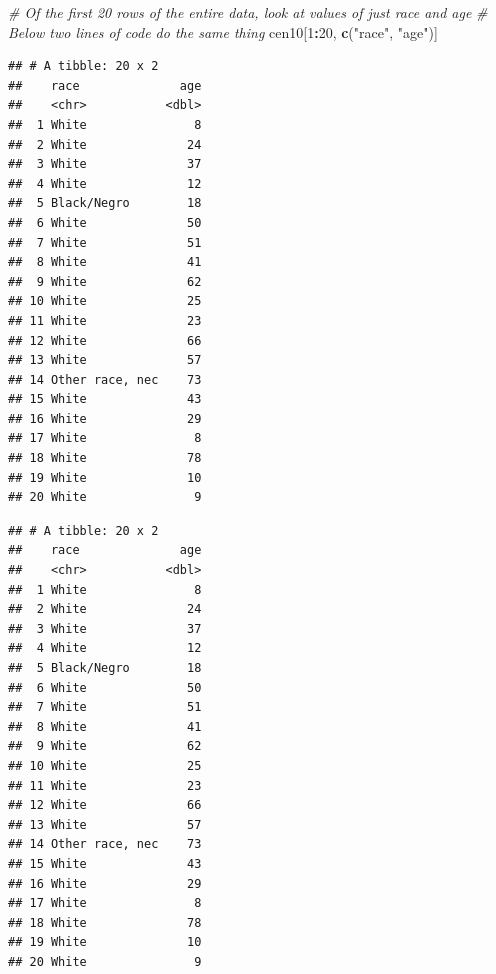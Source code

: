 \documentclass[]{book}
\newenvironment{Shaded}{\begin{snugshade}}{\end{snugshade}}
\newcommand{\KeywordTok}[1]{\textcolor[rgb]{0.13,0.29,0.53}{\textbf{#1}}}
\newcommand{\DecValTok}[1]{\textcolor[rgb]{0.00,0.00,0.81}{#1}}
\newcommand{\StringTok}[1]{\textcolor[rgb]{0.31,0.60,0.02}{#1}}
\newcommand{\CommentTok}[1]{\textcolor[rgb]{0.56,0.35,0.01}{\textit{#1}}}
\newcommand{\OperatorTok}[1]{\textcolor[rgb]{0.81,0.36,0.00}{\textbf{#1}}}
\newcommand{\NormalTok}[1]{#1}
\theoremstyle{definition}
\theoremstyle{definition}
\theoremstyle{definition}
\theoremstyle{remark}
\begin{document}
\begin{Shaded}
\begin{Highlighting}[]
\CommentTok{# Of the first 20 rows of the entire data, look at values of just race and age}
\CommentTok{# Below two lines of code do the same thing}
\NormalTok{cen10[}\DecValTok{1}\OperatorTok{:}\DecValTok{20}\NormalTok{, }\KeywordTok{c}\NormalTok{(}\StringTok{"race"}\NormalTok{, }\StringTok{"age"}\NormalTok{)]}
\end{Highlighting}
\end{Shaded}

\begin{verbatim}
## # A tibble: 20 x 2
##    race              age
##    <chr>           <dbl>
##  1 White               8
##  2 White              24
##  3 White              37
##  4 White              12
##  5 Black/Negro        18
##  6 White              50
##  7 White              51
##  8 White              41
##  9 White              62
## 10 White              25
## 11 White              23
## 12 White              66
## 13 White              57
## 14 Other race, nec    73
## 15 White              43
## 16 White              29
## 17 White               8
## 18 White              78
## 19 White              10
## 20 White               9
\end{verbatim}

\begin{Shaded}
\end{Shaded}

\begin{verbatim}
## # A tibble: 20 x 2
##    race              age
##    <chr>           <dbl>
##  1 White               8
##  2 White              24
##  3 White              37
##  4 White              12
##  5 Black/Negro        18
##  6 White              50
##  7 White              51
##  8 White              41
##  9 White              62
## 10 White              25
## 11 White              23
## 12 White              66
## 13 White              57
## 14 Other race, nec    73
## 15 White              43
## 16 White              29
## 17 White               8
## 18 White              78
## 19 White              10
## 20 White               9
\end{verbatim}
\end{document}
